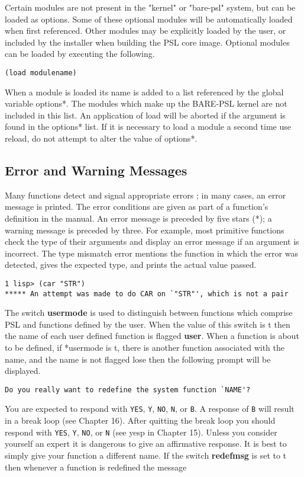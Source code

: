 Certain modules are not present in the "kernel" or  "bare-psl"
system,  but  can  be loaded as options.  Some of these optional
modules will be  automatically  loaded  when  first  referenced.
Other  modules may be explicitly loaded by the user, or included
by the installer when building the PSL  core  image.    Optional
modules can be loaded by executing the following.

\begin{verbatim}
(load modulename)
\end{verbatim}
When a module is loaded its name is added to a list referenced
by  the global variable options*.  The modules which make up the
BARE-PSL kernel are not included in this list.   An  application
of load will be aborted if the argument is found in the options*
list.    If  it  is necessary to load a module a second time use
reload, do not attempt to alter the value of options*.

\subsection{Error and Warning Messages}

Many functions  detect  and  signal  appropriate  errors ;  
in  many cases, an error message is
printed.  The error conditions are given as part of a function's
definition in the manual.  An error message is preceded by  five
stars (*); a warning message is preceded by three.  For example,
most  primitive  functions check the type of their arguments and
display an error message if an argument is incorrect.  The  type
mismatch  error  mentions  the  function  in which the error was
detected, gives the expected type, and prints the  actual  value
passed.

\begin{verbatim}
1 lisp> (car "STR")
***** An attempt was made to do CAR on `"STR"', which is not a pair
\end{verbatim}
The  switch {\bf usermode}
is used to distinguish between functions
which comprise PSL and functions defined by the user.  When  the
value  of  this  switch  is t then the name of each user defined
function is flagged {\bf user}. When a function is about to be
defined, if *usermode is t, there is another function associated
with  the  name,  and  the  name  is  not  flagged lose then the
following prompt will be displayed.
\begin{verbatim}
Do you really want to redefine the system function `NAME'?
\end{verbatim}
\noindent
You are expected to respond with \verb+YES+, \verb+Y+, 
\verb+NO+, \verb+N+,  or \verb+B+. A response  of \verb+B+ will 
result  in a break loop (see Chapter 16). After quitting the
break loop you should respond  with  \verb+YES+, \verb+Y+, 
\verb+NO+, or \verb+N+ (see yesp in Chapter 15).  Unless you
consider yourself an  expert  it is dangerous to give an
affirmative response.  It is best to simply give your function a
different name.
\noindent
If the switch {\bf redefmsg}
is set to t then whenever a function
is redefined the message

